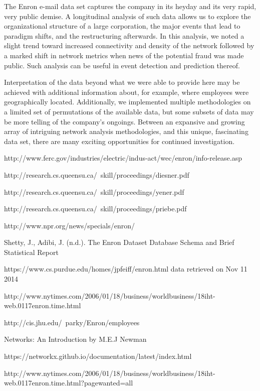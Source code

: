 \documentclass[12pt]{article}
\begin{document}
	The Enron e-mail data set captures the company in its heyday and its very rapid, very public demise. A longitudinal analysis of such data allows us to explore the organizational structure of a large corporation, the major events that lead to paradigm shifts, and the restructuring afterwards. In this analysis, we noted a slight trend toward increased connectivity and density of the network followed by a marked shift in network metrics when news of the potential fraud was made public. Such analysis can be useful in event detection and prediction thereof.
	
	Interpretation of the data beyond what we were able to provide here may be achieved with additional information about, for example, where employees were geographically located. Additionally, we implemented multiple methodologies on a limited set of permutations of the available data, but some subsets of data may be more telling of the company's ongoings. Between an expansive and growing array of intriguing network analysis methodologies, and this unique, fascinating data set, there are many exciting opportunities for continued investigation. 


\begin{thebibliography}{9}

http://www.ferc.gov/industries/electric/indus-act/wec/enron/info-release.asp

http://research.cs.queensu.ca/~skill/proceedings/diesner.pdf

http://research.cs.queensu.ca/~skill/proceedings/yener.pdf

http://research.cs.queensu.ca/~skill/proceedings/priebe.pdf

http://www.npr.org/news/specials/enron/

Shetty, J., Adibi, J. (n.d.). The Enron Dataset
Database Schema and Brief Statistical Report

https://www.cs.purdue.edu/homes/jpfeiff/enron.html
data retrieved on Nov 11 2014

http://www.nytimes.com/2006/01/18/business/worldbusiness/18iht-web.0117enron.time.html

http://cis.jhu.edu/~parky/Enron/employees

Networks: An Introduction by M.E.J Newman

https://networkx.github.io/documentation/latest/index.html

http://www.nytimes.com/2006/01/18/business/worldbusiness/18iht-web.0117enron.time.html?pagewanted=all



\end{thebibliography}
\end{document}
